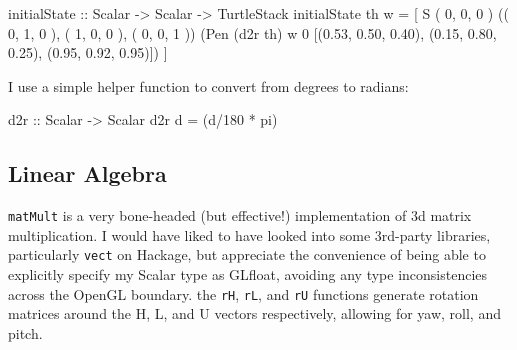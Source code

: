 \documentclass[]{article}
\newenvironment{Shaded}{}{}
\newcommand{\DataTypeTok}[1]{\textcolor[rgb]{0.56,0.13,0.00}{{#1}}}
\newcommand{\DecValTok}[1]{\textcolor[rgb]{0.25,0.63,0.44}{{#1}}}
\newcommand{\FloatTok}[1]{\textcolor[rgb]{0.25,0.63,0.44}{{#1}}}
\newcommand{\OtherTok}[1]{\textcolor[rgb]{0.00,0.44,0.13}{{#1}}}
\newcommand{\FunctionTok}[1]{\textcolor[rgb]{0.02,0.16,0.49}{{#1}}}
\newcommand{\NormalTok}[1]{{#1}}
\begin{document}
\begin{Shaded}
\begin{Highlighting}[]
\OtherTok{initialState      ::} \DataTypeTok{Scalar} \OtherTok{->} \DataTypeTok{Scalar} \OtherTok{->} \DataTypeTok{TurtleStack}
\NormalTok{initialState th w  }\FunctionTok{=} \NormalTok{[ }\DataTypeTok{S} \NormalTok{( }\DecValTok{0}\NormalTok{, }\DecValTok{0}\NormalTok{, }\DecValTok{0} \NormalTok{)}
                         \NormalTok{(( }\DecValTok{0}\NormalTok{, }\DecValTok{1}\NormalTok{, }\DecValTok{0} \NormalTok{),}
                          \NormalTok{( }\DecValTok{1}\NormalTok{, }\DecValTok{0}\NormalTok{, }\DecValTok{0} \NormalTok{),}
                          \NormalTok{( }\DecValTok{0}\NormalTok{, }\DecValTok{0}\NormalTok{, }\DecValTok{1} \NormalTok{))}
                         \NormalTok{(}\DataTypeTok{Pen} \NormalTok{(d2r th) w }\DecValTok{0} \NormalTok{[(}\FloatTok{0.53}\NormalTok{, }\FloatTok{0.50}\NormalTok{, }\FloatTok{0.40}\NormalTok{),}
                                            \NormalTok{(}\FloatTok{0.15}\NormalTok{, }\FloatTok{0.80}\NormalTok{, }\FloatTok{0.25}\NormalTok{),}
                                            \NormalTok{(}\FloatTok{0.95}\NormalTok{, }\FloatTok{0.92}\NormalTok{, }\FloatTok{0.95}\NormalTok{)]) ]}
\end{Highlighting}
\end{Shaded}
I use a simple helper function to convert from degrees to radians:

\begin{Shaded}
\begin{Highlighting}[]
\OtherTok{d2r    ::} \DataTypeTok{Scalar} \OtherTok{->} \DataTypeTok{Scalar}
\NormalTok{d2r d   }\FunctionTok{=} \NormalTok{(d}\FunctionTok{/}\DecValTok{180} \FunctionTok{*} \FunctionTok{pi}\NormalTok{)}
\end{Highlighting}
\end{Shaded}
\subsection{Linear Algebra}

\texttt{matMult} is a very bone-headed (but effective!) implementation
of 3d matrix multiplication. I would have liked to have looked into some
3rd-party libraries, particularly \texttt{vect} on Hackage, but
appreciate the convenience of being able to explicitly specify my Scalar
type as GLfloat, avoiding any type inconsistencies across the OpenGL
boundary. the \texttt{rH}, \texttt{rL}, and \texttt{rU} functions
generate rotation matrices around the H, L, and U vectors respectively,
allowing for yaw, roll, and pitch.
\end{document}
